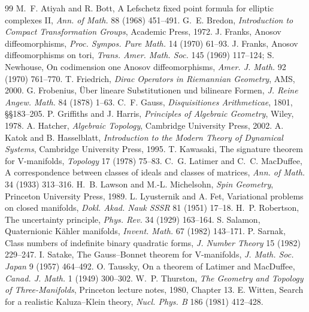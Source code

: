 \documentclass[11pt,a4paper]{article}
\theoremstyle{plain}
\theoremstyle{definition}
\theoremstyle{remark}
\begin{document}
\begin{thebibliography}{99}
 M.~F. Atiyah and R. Bott, A Lefschetz fixed point formula for elliptic complexes II, \emph{Ann. of Math.} 88 (1968) 451--491.
 G.~E. Bredon, \emph{Introduction to Compact Transformation Groups}, Academic Press, 1972.
 J. Franks, Anosov diffeomorphisms, \emph{Proc. Sympos. Pure Math.} 14 (1970) 61--93.
 J. Franks, Anosov diffeomorphisms on tori, \emph{Trans. Amer. Math. Soc.} 145 (1969) 117--124; S. Newhouse, On codimension one Anosov diffeomorphisms, \emph{Amer. J. Math.} 92 (1970) 761--770.
 T. Friedrich, \emph{Dirac Operators in Riemannian Geometry}, AMS, 2000.
 G. Frobenius, \"Uber lineare Substitutionen und bilineare Formen, \emph{J. Reine Angew. Math.} 84 (1878) 1--63.
 C.~F. Gauss, \emph{Disquisitiones Arithmeticae}, 1801, \S\S183--205.
 P. Griffiths and J. Harris, \emph{Principles of Algebraic Geometry}, Wiley, 1978.
 A. Hatcher, \emph{Algebraic Topology}, Cambridge University Press, 2002.
 A. Katok and B. Hasselblatt, \emph{Introduction to the Modern Theory of Dynamical Systems}, Cambridge University Press, 1995.
 T. Kawasaki, The signature theorem for V-manifolds, \emph{Topology} 17 (1978) 75--83.
 C.~G. Latimer and C.~C. MacDuffee, A correspondence between classes of ideals and classes of matrices, \emph{Ann. of Math.} 34 (1933) 313--316.
 H.~B. Lawson and M.-L. Michelsohn, \emph{Spin Geometry}, Princeton University Press, 1989.
 L. Lyusternik and A. Fet, Variational problems on closed manifolds, \emph{Dokl. Akad. Nauk SSSR} 81 (1951) 17--18.
 H.~P. Robertson, The uncertainty principle, \emph{Phys. Rev.} 34 (1929) 163--164.
 S. Salamon, Quaternionic K\"ahler manifolds, \emph{Invent. Math.} 67 (1982) 143--171.
 P. Sarnak, Class numbers of indefinite binary quadratic forms, \emph{J. Number Theory} 15 (1982) 229--247.
 I. Satake, The Gauss--Bonnet theorem for V-manifolds, \emph{J. Math. Soc. Japan} 9 (1957) 464--492.
 O. Taussky, On a theorem of Latimer and MacDuffee, \emph{Canad. J. Math.} 1 (1949) 300--302.
 W.~P. Thurston, \emph{The Geometry and Topology of Three-Manifolds}, Princeton lecture notes, 1980, Chapter 13.
 E. Witten, Search for a realistic Kaluza--Klein theory, \emph{Nucl. Phys. B} 186 (1981) 412--428.
\end{thebibliography}
\end{document}
